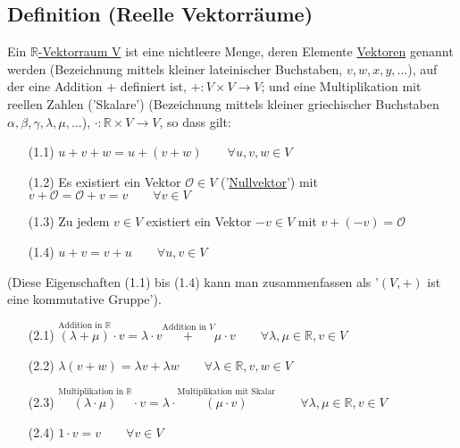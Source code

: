 \documentclass[12pt, titlepage]{article}
\newcommand{\R}{\mathds{R}}
\renewcommand{\O}{\mathcal{O}}
\renewcommand{\>}{\rightarrow}
\renewcommand{\*}{\cdot}
\begin{document}
	\subsection{Definition (Reelle Vektorräume)}
	Ein \underline{$\R$-Vektorraum V} ist eine nichtleere Menge, deren Elemente \underline{Vektoren} genannt werden (Bezeichnung mittels kleiner lateinischer Buchstaben, $v,w,x,y,...$), auf der eine Addition $+$ definiert ist, $+\colon V\times V\>V$; und eine Multiplikation mit reellen Zahlen ('Skalare') (Bezeichnung mittels kleiner griechischer Buchstaben $\alpha, \beta, \gamma, \lambda,\mu,...$), $\*\colon\R\times V\>V$, so dass gilt:
	\begin{itemize}
		\item[(1.1)] $u+v+w=u+(v+w)\qquad\forall u,v,w\in V$
		\item[(1.2)] Es existiert ein Vektor $\O\in V$ ('\underline{Nullvektor}') mit $v+\O=\O+v=v\qquad\forall v\in V$
		\item[(1.3)] Zu jedem $v\in V$ existiert ein Vektor $-v\in V$ mit $v+(-v)=\O$
		\item[(1.4)] $u+v=v+u\qquad\forall u,v\in V$
	\end{itemize}
	(Diese Eigenschaften (1.1) bis (1.4) kann man zusammenfassen als '$(V,+)$ ist eine kommutative Gruppe').
	\begin{itemize}
		\item[(2.1)] $\overset{\textrm{Addition in }\R}{(\lambda+\mu)}\*v=\lambda\*v\overset{\textrm{Addition in }V}{+}\mu\*v\qquad\forall\lambda,\mu\in\R,v\in V$
		\item[(2.2)] $\lambda(v+w)=\lambda v+\lambda w\qquad\forall\lambda\in\R,v,w\in V$
		\item[(2.3)] $\overset{\textrm{Multiplikation in }\R}{(\lambda\*\mu)}\*v=\lambda\*\overset{\textrm{Multiplikation mit Skalar}}{(\mu\*v)}\qquad\forall\lambda,\mu\in\R,v\in V$
		\item[(2.4)] $1\*v=v\qquad\forall v\in V$
	\end{itemize}
\end{document}
